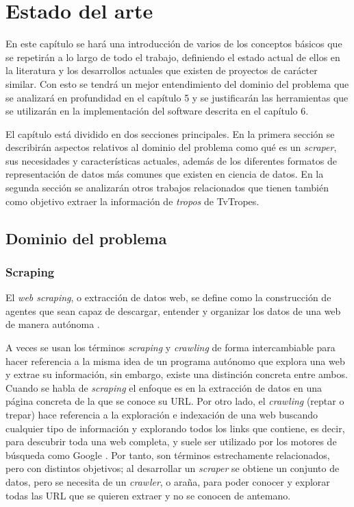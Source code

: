 \chapter{Estado del arte}

En este capítulo se hará una introducción de varios de los conceptos básicos que
se repetirán a lo largo de todo el trabajo, definiendo el estado actual de ellos
en la literatura y los desarrollos actuales que existen de proyectos de carácter
similar. Con esto se tendrá un mejor entendimiento del dominio del problema que
se analizará en profundidad en el capítulo 5 y se justificarán las herramientas
que se utilizarán en la implementación del software descrita en el capítulo 6.

El capítulo está dividido en dos secciones principales. En la primera sección se
describirán aspectos relativos al dominio del problema como qué es un
\textit{scraper}, sus necesidades y características actuales, además de los
diferentes formatos de representación de datos más comunes que existen en
ciencia de datos. En la segunda sección se analizarán otros trabajos
relacionados que tienen también como objetivo extraer la información de
\textit{tropos} de TvTropes. 

\section{Dominio del problema}
\subsection{Scraping}
El \textit{web scraping}, o extracción de datos web, se define como la
construcción de agentes que sean capaz de descargar, entender y organizar los
datos de una web de manera autónoma \cite{apress2018scraping}. 

A veces se usan los términos \textit{scraping} y \textit{crawling} de forma
intercambiable para hacer referencia a la misma idea de un programa autónomo que
explora una web y extrae su información, sin embargo, existe una distinción
concreta entre ambos. Cuando se habla de \textit{scraping} el enfoque es en la
extracción de datos en una página concreta de la que se conoce su URL. Por otro
lado, el \textit{crawling} (reptar o trepar) hace referencia a la exploración e
indexación de una web buscando cualquier tipo de información y explorando todos
los links que contiene, es decir, para descubrir toda una web completa, y suele
ser utilizado por los motores de búsqueda como Google \cite{scrapingvscrawling}.
Por tanto, son términos estrechamente relacionados, pero con distintos
objetivos; al desarrollar un \textit{scraper} se obtiene un conjunto de datos,
pero se necesita de un \textit{crawler}, o araña, para poder conocer y explorar
todas las URL que se quieren extraer y no se conocen de antemano.

